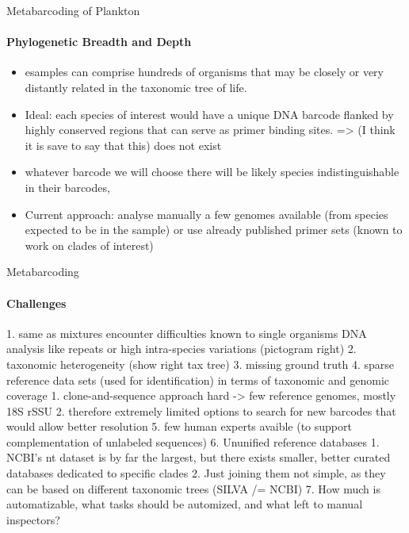 \documentclass[xcolor=dvipsnames,envcountsect]{beamer}
\begin{document}
\begin{frame}{Metabarcoding of Plankton}\framesubtitle{Phylogenetic Breadth and Depth}
\begin{itemize}
    \item esamples can comprise hundreds of organisms that may be closely or very distantly related in the taxonomic tree of life.
    \item Ideal: each species of interest would have a unique DNA barcode flanked by highly conserved regions that can serve as primer binding sites. => (I think it is save to say that this) does not exist
    \item whatever barcode we will choose there will be likely species indistinguishable in their barcodes, 
    \item Current approach: analyse manually a few genomes available (from species expected to be in the sample) or use already published primer sets (known to work on clades of interest)
\end{itemize}
\end{frame}


\begin{frame}{Metabarcoding}\framesubtitle{Challenges}
1. same as mixtures encounter difficulties known to single organisms DNA analysis like repeats or high intra-species variations (pictogram right)
2. taxonomic heterogeneity (show right tax tree)
3. missing ground truth
4. sparse reference data sets (used for identification) in terms of taxonomic and genomic coverage
    1. clone-and-sequence approach hard -> few reference genomes, mostly 18S rSSU
    2.  therefore extremely limited options to search for new barcodes that would allow better resolution
5. few human experts avaible (to support complementation of unlabeled sequences)
6. Ununified reference databases
    1. NCBI’s nt dataset is by far the largest, but there exists smaller, better curated databases dedicated to specific clades
    2. Just joining them not simple, as they can be based on different taxonomic trees (SILVA /= NCBI)
7. How much is automatizable, what tasks should be automized, and what left to manual inspectors?
\end{frame}
\end{document}

